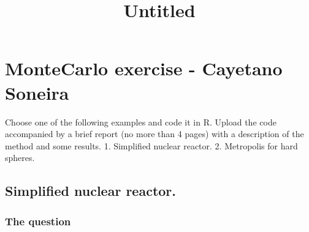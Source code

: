 \documentclass[11pt]{article}
\title{Untitled}
\begin{document}
    
    \maketitle
    
    

    
    \hypertarget{montecarlo-exercise---cayetano-soneira}{%
\section{\texorpdfstring{\textbf{MonteCarlo exercise} - Cayetano
Soneira}{MonteCarlo exercise - Cayetano Soneira}}\label{montecarlo-exercise---cayetano-soneira}}

Choose one of the following examples and code it in R. Upload the code
accompanied by a brief report (no more than 4 pages) with a description
of the method and some results. 1. Simplified nuclear reactor. 2.
Metropolis for hard spheres.

\hypertarget{simplified-nuclear-reactor.}{%
\subsection{\texorpdfstring{\textbf{Simplified nuclear
reactor.}}{Simplified nuclear reactor.}}\label{simplified-nuclear-reactor.}}

\hypertarget{the-question}{%
\subsubsection{\texorpdfstring{\textbf{The
question}}{The question}}\label{the-question}}
\end{document}
